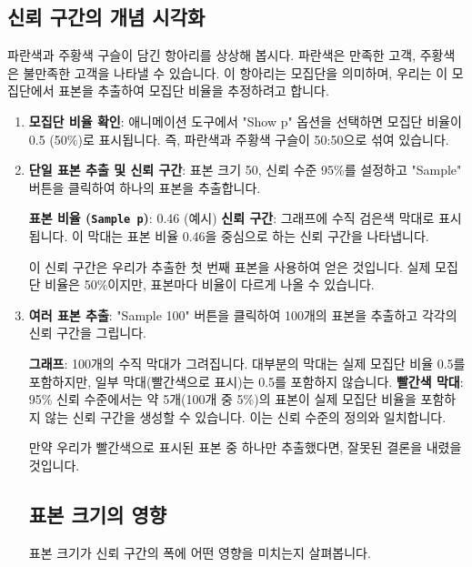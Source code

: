 \documentclass[11pt,a4paper]{book}
\newcommand{\excel}[1]{\texttt{#1}}
\theoremstyle{definition}
\begin{document}
\subsection{신뢰 구간의 개념 시각화}
파란색과 주황색 구슬이 담긴 항아리를 상상해 봅시다. 파란색은 만족한 고객, 주황색은 불만족한 고객을 나타낼 수 있습니다. 이 항아리는 모집단을 의미하며, 우리는 이 모집단에서 표본을 추출하여 모집단 비율을 추정하려고 합니다.

\begin{enumerate}
    \item \textbf{모집단 비율 확인}:
    애니메이션 도구에서 "Show p" 옵션을 선택하면 모집단 비율이 0.5 (50\%)로 표시됩니다. 즉, 파란색과 주황색 구슬이 50:50으로 섞여 있습니다.

    \item \textbf{단일 표본 추출 및 신뢰 구간}:
    표본 크기 50, 신뢰 수준 95\%를 설정하고 "Sample" 버튼을 클릭하여 하나의 표본을 추출합니다.
    \begin{examplebox}[title=단일 표본 결과]
        \textbf{표본 비율 (\excel{Sample p})}: 0.46 (예시)
        \textbf{신뢰 구간}: 그래프에 수직 검은색 막대로 표시됩니다. 이 막대는 표본 비율 0.46을 중심으로 하는 신뢰 구간을 나타냅니다.
    \end{examplebox}
    이 신뢰 구간은 우리가 추출한 첫 번째 표본을 사용하여 얻은 것입니다. 실제 모집단 비율은 50\%이지만, 표본마다 비율이 다르게 나올 수 있습니다.

    \item \textbf{여러 표본 추출}:
    "Sample 100" 버튼을 클릭하여 100개의 표본을 추출하고 각각의 신뢰 구간을 그립니다.
    \begin{examplebox}[title=100개 표본 결과]
        \textbf{그래프}: 100개의 수직 막대가 그려집니다. 대부분의 막대는 실제 모집단 비율 0.5를 포함하지만, 일부 막대(빨간색으로 표시)는 0.5를 포함하지 않습니다.
        \textbf{빨간색 막대}: 95\% 신뢰 수준에서는 약 5개(100개 중 5\%)의 표본이 실제 모집단 비율을 포함하지 않는 신뢰 구간을 생성할 수 있습니다. 이는 신뢰 수준의 정의와 일치합니다.
    \end{examplebox}
    만약 우리가 빨간색으로 표시된 표본 중 하나만 추출했다면, 잘못된 결론을 내렸을 것입니다.

\subsection{표본 크기의 영향}
표본 크기가 신뢰 구간의 폭에 어떤 영향을 미치는지 살펴봅니다.


\end{enumerate}
\end{document}
